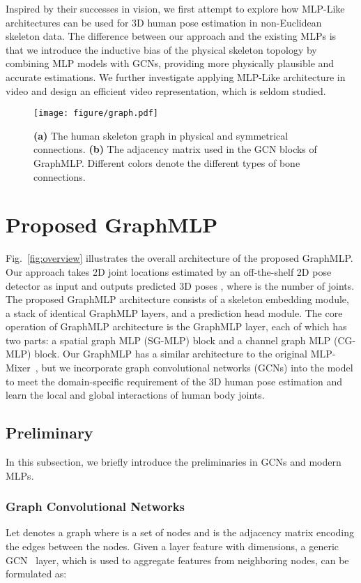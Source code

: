 \documentclass[lettersize,journal]{IEEEtran}
\begin{document}
Inspired by their successes in vision, we first attempt to explore how MLP-Like architectures can be used for 3D human pose estimation in non-Euclidean skeleton data. 
The difference between our approach and the existing MLPs is that we introduce the inductive bias of the physical skeleton topology by combining MLP models with GCNs, providing more physically plausible and accurate estimations. 
We further investigate applying MLP-Like architecture in video and design an efficient video representation, which is seldom studied. 

\begin{figure}[t]
\centering
\texttt{[image: figure/graph.pdf]}
\caption
{
\textbf{(a)} The human skeleton graph in physical and symmetrical connections. 
\textbf{(b)} The adjacency matrix used in the GCN blocks of GraphMLP. 
Different colors denote the different types of bone connections. 
}
\label{fig:graph}
\end{figure}

\section{Proposed GraphMLP}
Fig.~\ref{fig:overview} illustrates the overall architecture of the proposed GraphMLP. 
Our approach takes 2D joint locations  estimated by an off-the-shelf 2D pose detector as input and outputs predicted 3D poses , where  is the number of joints. 
The proposed GraphMLP architecture consists of a skeleton embedding module, a stack of  identical GraphMLP layers, and a prediction head module. 
The core operation of GraphMLP architecture is the GraphMLP layer, each of which has two parts: a spatial graph MLP (SG-MLP) block and a channel graph MLP (CG-MLP) block. 
Our GraphMLP has a similar architecture to the original MLP-Mixer~\cite{mlpmixer}, but we incorporate graph convolutional networks (GCNs) into the model to meet the domain-specific requirement of the 3D human pose estimation and learn the local and global interactions of human body joints. 

\subsection{Preliminary}
\label{sec:preliminary}
In this subsection, we briefly introduce the preliminaries in GCNs and modern MLPs. 

\subsubsection{Graph Convolutional Networks}
Let  denotes a graph where  is a set of  nodes and  is the adjacency matrix encoding the edges between the nodes. 
Given a  layer feature  with  dimensions, a generic GCN~\cite{kipf2016semi} layer, which is used to aggregate features from neighboring nodes, can be formulated as:
\end{document}
